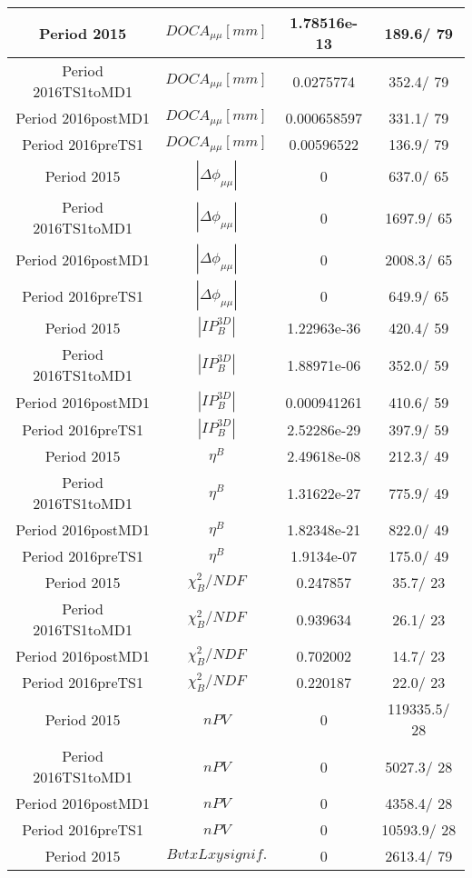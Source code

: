 \documentclass{article}
\begin{document}
\begin{longtable}{c|c|c|c}
\hline
 Period 2015 & $DOCA_{\mu\mu} [mm]$ & 1.78516e-13 & 189.6/ 79\\
\hline
 Period 2016TS1toMD1 & $DOCA_{\mu\mu} [mm]$ & 0.0275774 & 352.4/ 79\\
\hline
 Period 2016postMD1 & $DOCA_{\mu\mu} [mm]$ & 0.000658597 & 331.1/ 79\\
\hline
 Period 2016preTS1 & $DOCA_{\mu\mu} [mm]$ & 0.00596522 & 136.9/ 79\\
\hline
 Period 2015 & $|\Delta\phi_{\mu\mu}|$ & 0 & 637.0/ 65\\
\hline
 Period 2016TS1toMD1 & $|\Delta\phi_{\mu\mu}|$ & 0 & 1697.9/ 65\\
\hline
 Period 2016postMD1 & $|\Delta\phi_{\mu\mu}|$ & 0 & 2008.3/ 65\\
\hline
 Period 2016preTS1 & $|\Delta\phi_{\mu\mu}|$ & 0 & 649.9/ 65\\
\hline
 Period 2015 & $|IP_{B}^{3D}|$ & 1.22963e-36 & 420.4/ 59\\
\hline
 Period 2016TS1toMD1 & $|IP_{B}^{3D}|$ & 1.88971e-06 & 352.0/ 59\\
\hline
 Period 2016postMD1 & $|IP_{B}^{3D}|$ & 0.000941261 & 410.6/ 59\\
\hline
 Period 2016preTS1 & $|IP_{B}^{3D}|$ & 2.52286e-29 & 397.9/ 59\\
\hline
 Period 2015 & $\eta^{B}$ & 2.49618e-08 & 212.3/ 49\\
\hline
 Period 2016TS1toMD1 & $\eta^{B}$ & 1.31622e-27 & 775.9/ 49\\
\hline
 Period 2016postMD1 & $\eta^{B}$ & 1.82348e-21 & 822.0/ 49\\
\hline
 Period 2016preTS1 & $\eta^{B}$ & 1.9134e-07 & 175.0/ 49\\
\hline
 Period 2015 & $\chi^{2}_{B}/NDF$ & 0.247857 &  35.7/ 23\\
\hline
 Period 2016TS1toMD1 & $\chi^{2}_{B}/NDF$ & 0.939634 &  26.1/ 23\\
\hline
 Period 2016postMD1 & $\chi^{2}_{B}/NDF$ & 0.702002 &  14.7/ 23\\
\hline
 Period 2016preTS1 & $\chi^{2}_{B}/NDF$ & 0.220187 &  22.0/ 23\\
\hline
 Period 2015 & $nPV$ & 0 & 119335.5/ 28\\
\hline
 Period 2016TS1toMD1 & $nPV$ & 0 & 5027.3/ 28\\
\hline
 Period 2016postMD1 & $nPV$ & 0 & 4358.4/ 28\\
\hline
 Period 2016preTS1 & $nPV$ & 0 & 10593.9/ 28\\
\hline
 Period 2015 & $BvtxLxy signif.$ & 0 & 2613.4/ 79\\

\end{longtable}
\end{document}
